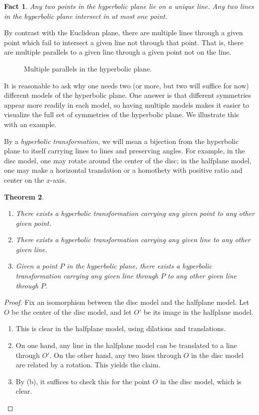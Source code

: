 \documentclass[12pt]{book}
\numberwithin{exc}{section}
\numberwithin{figure}{section}
\newtheorem{theorem}{Theorem}[section]
\newtheorem{fact}[theorem]{Fact}
\numberwithin{equation}{theorem}
\begin{document}
\begin{fact}
Any two points in the hyperbolic plane lie on a unique line.
Any two lines in the hyperbolic plane intersect in at most one point.
\end{fact}
By contrast with the Euclidean plane, there are multiple lines through
a given point which fail to intersect a given line not through that point.
That is, there are multiple parallels to a given line through a given
point not on the line.
\begin{figure}[ht]
\caption{Multiple parallels in the hyperbolic plane.}
\end{figure}

It is reasonable to ask why one needs two (or more, but two will suffice
for now) different models of
the hyperbolic plane. One answer is that different
symmetries appear more readily in each model, so having multiple models
makes it easier to visualize the full set of symmetries of the hyperbolic
plane. We illustrate this with an example.

By a \emph{hyperbolic transformation}, 
we will mean a bijection
from the hyperbolic plane to itself carrying lines to lines and preserving
angles.
For example, in the disc model, one may rotate around the center of the disc;
in the halfplane model, one may make a horizontal translation or a 
homothety with positive ratio and center on the $x$-axis.

\begin{theorem}\label{thm:hyperbolic transf}
\begin{enumerate}
\item[(a)]
There exists a hyperbolic transformation carrying any given point to any
other given point.
\item[(b)]
There exists a hyperbolic transformation carrying any given line to any
other given line.
\item[(c)]
Given a point $P$ in the hyperbolic plane, there exists a hyperbolic
transformation carrying any given line through $P$ to any other given line
through $P$.
\end{enumerate}
\end{theorem}
\begin{proof}
Fix an isomorphism between the disc model and the halfplane model.
Let $O$ be the center of the disc model, and let $O'$ be its image in
the halfplane model.
\begin{enumerate}
\item[(a)]
This is clear in the halfplane model, using dilations and translations.
\item[(b)]
On one hand,
any line in the halfplane model can be translated
to a line through $O'$. On the other hand, any two lines through $O$
in the disc model are related by a rotation. This yields the claim.
\item[(c)] 
By (b), it suffices to check this for the point $O$ in the disc model,
which is clear.
\end{enumerate}
\end{proof}
\end{document}
